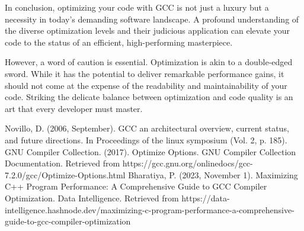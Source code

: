 \documentclass[conference]{IEEEtran}
\begin{document}
In conclusion, optimizing your code with GCC is not just a luxury but a necessity in today's demanding software landscape. A profound understanding of the diverse optimization levels and their judicious application can elevate your code to the status of an efficient, high-performing masterpiece.

However, a word of caution is essential. Optimization is akin to a double-edged sword. While it has the potential to deliver remarkable performance gains, it should not come at the expense of the readability and maintainability of your code. Striking the delicate balance between optimization and code quality is an art that every developer must master.

\begin{thebibliography}{00}
	 Novillo, D. (2006, September). GCC an architectural overview, current status, and future directions. In Proceedings of the linux symposium (Vol. 2, p. 185).
	 GNU Compiler Collection. (2017). Optimize Options. GNU Compiler Collection Documentation. Retrieved from https://gcc.gnu.org/onlinedocs/gcc-7.2.0/gcc/Optimize-Options.html
	 Bharatiya, P. (2023, November 1). Maximizing C++ Program Performance: A Comprehensive Guide to GCC Compiler Optimization. Data Intelligence. Retrieved from https://data-intelligence.hashnode.dev/maximizing-c-program-performance-a-comprehensive-guide-to-gcc-compiler-optimization
\end{thebibliography}


\vspace{12pt}
\vspace{12pt}
\end{document}
